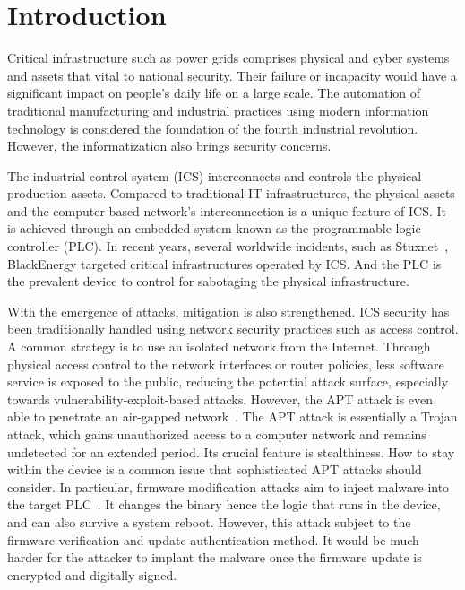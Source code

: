 \section{Introduction}
\label{sec:implant-introduction}

Critical infrastructure such as power grids comprises physical and cyber systems and assets that vital to national security. Their failure or incapacity would have a significant impact on people's daily life on a large scale. The automation of traditional manufacturing and industrial practices using modern information technology is considered the foundation of the fourth industrial revolution.  However, the informatization also brings security concerns. 

The industrial control system (ICS) interconnects and controls the physical production assets.  Compared to traditional IT infrastructures, the physical assets and the computer-based network's interconnection is a unique feature of ICS. It is achieved through an embedded system known as the programmable logic controller (PLC). In recent years, several worldwide incidents, such as Stuxnet~\cite{langner2011stuxnet}, BlackEnergy targeted critical infrastructures operated by ICS. And the PLC is the prevalent device to control for sabotaging the physical infrastructure.


With the emergence of attacks, mitigation is also strengthened. ICS security has been traditionally handled using network security practices such as access control. A common strategy is to use an isolated network from the Internet. Through physical access control to the network interfaces or router policies, less software service is exposed to the public, reducing the potential attack surface, especially towards vulnerability-exploit-based attacks. However, the APT attack is even able to penetrate an air-gapped network~\cite{langner2011stuxnet}. The APT attack is essentially a Trojan attack, which gains unauthorized access to a computer network and remains undetected for an extended period. Its crucial feature is stealthiness. How to stay within the device is a common issue that sophisticated APT attacks should consider. In particular, firmware modification attacks aim to inject malware into the target PLC~\cite{garcia2017hey}.  It changes the binary hence the logic that runs in the device, and can also survive a system reboot. However, this attack subject to the firmware verification and update authentication method. It would be much harder for the attacker to implant the malware once the firmware update is encrypted and digitally signed. 

